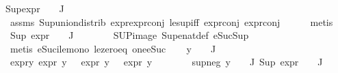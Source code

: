 \begin{isabellebody}
{\isachardoublequoteopen}Sup{\isacharparenleft}{\kern0pt}{\isacharparenleft}{\kern0pt}expr{\isacharunderscore}{\kern0pt}{}\ {\isasymcirc}\ {\isasymPhi}{\isacharparenright}{\kern0pt}\ {\isacharbackquote}{\kern0pt}\ J{\isacharparenright}{\kern0pt}\ {\isasymle}\ {}{\isachardoublequoteclose}\isanewline
\ \ \ \ \isamarkupfalse%
\ assms\ Sup{\isacharunderscore}{\kern0pt}union{\isacharunderscore}{\kern0pt}distrib\ expr{\isacharunderscore}{\kern0pt}{}{\isachardot}{\kern0pt}expr{\isacharunderscore}{\kern0pt}{}{\isacharunderscore}{\kern0pt}conj\ le{\isacharunderscore}{\kern0pt}sup{\isacharunderscore}{\kern0pt}iff\ expr{\isacharunderscore}{\kern0pt}{}{\isacharunderscore}{\kern0pt}conj\ expr{\isacharunderscore}{\kern0pt}{}{\isacharunderscore}{\kern0pt}conj\isanewline
\ \ \ \ \isamarkupfalse%
\ metis{\isacharplus}{\kern0pt}\isanewline
\ \ \isamarkupfalse%
\ {\isachardoublequoteopen}Sup\ {\isacharparenleft}{\kern0pt}{\isacharparenleft}{\kern0pt}expr{\isacharunderscore}{\kern0pt}{}\ {\isasymcirc}\ {\isasymPhi}{\isacharparenright}{\kern0pt}\ {\isacharbackquote}{\kern0pt}\ J{\isacharparenright}{\kern0pt}\ {\isasymle}\ {}{\isachardoublequoteclose}\isanewline
\ \ \ \ \isamarkupfalse%
\ SUP{\isacharunderscore}{\kern0pt}image\ Sup{\isacharunderscore}{\kern0pt}enat{\isacharunderscore}{\kern0pt}def\ eSuc{\isacharunderscore}{\kern0pt}Sup\isanewline
\ \ \ \ \isamarkupfalse%
\ {\isacharparenleft}{\kern0pt}metis\ eSuc{\isacharunderscore}{\kern0pt}ile{\isacharunderscore}{\kern0pt}mono\ le{\isacharunderscore}{\kern0pt}zero{\isacharunderscore}{\kern0pt}eq\ one{\isacharunderscore}{\kern0pt}eSuc{\isacharparenright}{\kern0pt}\isanewline
\ \ \isamarkupfalse%
\ {\isachardoublequoteopen}y\ {\isasymin}\ {\isasymPhi}\ {\isacharbackquote}{\kern0pt}\ J{\isachardoublequoteclose}\isanewline
\ \ \isamarkupfalse%
\ expr{\isacharunderscore}{\kern0pt}y{\isacharcolon}{\kern0pt}\ {\isachardoublequoteopen}expr{\isacharunderscore}{\kern0pt}{}\ y\ {\isasymle}\ {}{\isachardoublequoteclose}\ {\isachardoublequoteopen}expr{\isacharunderscore}{\kern0pt}{}\ y\ {\isasymle}\ {}{\isachardoublequoteclose}\ {\isachardoublequoteopen}expr{\isacharunderscore}{\kern0pt}{}\ y\ {\isasymle}\ {}{\isachardoublequoteclose}\isanewline
\ \ \ \ \isamarkupfalse%
\ sup{\isacharunderscore}{\kern0pt}neg\ {\isacartoucheopen}y\ {\isasymin}\ {\isasymPhi}\ {\isacharbackquote}{\kern0pt}\ J{\isacartoucheclose}\ {\isacartoucheopen}Sup\ {\isacharparenleft}{\kern0pt}{\isacharparenleft}{\kern0pt}expr{\isacharunderscore}{\kern0pt}{}\ {\isasymcirc}\ {\isasymPhi}{\isacharparenright}{\kern0pt}\ {\isacharbackquote}{\kern0pt}\ J{\isacharparenright}{\kern0pt}\ {\isasymle}\ {}{\isacartoucheclose}\isanewline

\end{isabellebody}
